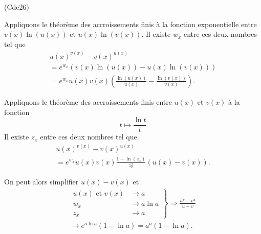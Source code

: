 \begin{tiny}(Cde26)\end{tiny} Appliquons le théorème des accroissements finis à la fonction exponentielle entre $v(x)\ln(u(x))$ et $u(x)\ln(v(x))$.\newline
Il existe $w_x$ entre ces deux nombres tel que
\begin{multline*}
 u(x)^{v(x)} - v(x)^{u(x)} \\
 = e^{w_x}\left( v(x)\ln(u(x)) - u(x)\ln(v(x))\right)\\
 = e^{w_x}u(x)v(x)\left( \frac{\ln(u(x))}{u(x)} - \frac{\ln(v(x))}{v(x)}\right). 
\end{multline*}

Appliquons le théorème des accroissements finis entre $u(x)$ et $v(x)$ à la fonction
\[
 t\mapsto \frac{\ln t}{t}
\]
Il existe $z_x$ entre ces deux nombres tel que
\begin{multline*}
 u(x)^{v(x)} - v(x)^{u(x)} \\
 = e^{w_x}u(x)v(x)\frac{1-\ln(z_x)}{z_x^2}\left(u(x) - v(x)\right). 
\end{multline*}

On peut alors simplifier $u(x) - v(x)$ et 
\begin{multline*}
 \left. 
 \begin{aligned}
  u(x) \text{ et } v(x) &\rightarrow a\\
  w_x &\rightarrow a\ln a \\
  z_x &\rightarrow a
 \end{aligned}
\right\rbrace 
\Rightarrow
\frac{u^{v} - v^{u}}{u - v} \\
\rightarrow e^{a\ln a} (1 - \ln a) = a^a (1 - \ln a).
\end{multline*}

